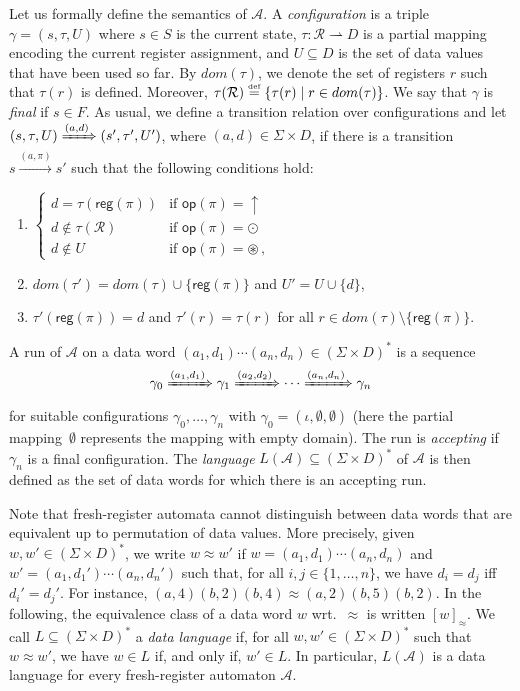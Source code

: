 \documentclass{LMCS}
\newcommand\df{\ensuremath{\mathrel{\smash{\stackrel{\scriptscriptstyle{
    \text{def}}}{=}}}}}
\newcommand{\pto}{\rightharpoonup}
\newcommand{\set}[1]{\{1,\ldots,#1\}}
\newcommand\domain[1]{dom(#1)}
\newcommand{\Data}{D}
\def\A{\mathcal A}
\newcommand{\Reg}{\mathcal{R}}
\newcommand{\regof}[1]{\textsf{reg}(#1)}
\newcommand{\opof}[1]{\textsf{op}(#1)}
\newcommand{\fStates}{F}
\newcommand{\States}{S}
\newcommand{\init}{\iota}
\newcommand{\xregtrans}[1]{\xrightarrow{#1}}
\newcommand{\conf}{\gamma}
\newcommand{\regm}{\tau}
\newcommand{\Used}{U}
\newcommand{\xconfrel}[1]{\xRightarrow{#1}}
\newcommand{\param}{\pi}
\begin{document}
Let us formally define the semantics of $\A$. A \emph{configuration} is a
triple $\conf = (s,\regm,\Used)$ where $s \in \States$ is the current
state, $\regm: \Reg \pto \Data$ is a partial mapping encoding the
current register assignment, and $\Used \subseteq \Data$ is the set of data values that have
been used so far. By $\domain \regm$, we denote the set of registers $r$ such that $\regm(r)$ is defined.
Moreover, $\regm(\Reg) \df \{\regm(r) \mid r \in \domain{\regm}\}$.
We say that $\conf$ is \emph{final} if $s \in
\fStates$. As usual, we define a transition relation over
configurations and let $(s,\regm,\Used) \xconfrel{(a,d)}
(s',\regm',\Used')$, where $(a,d) \in \Sigma \times \Data$, if there is
a transition $s \xregtrans{(a,\param)} s'$ such that the following
conditions hold:
\begin{enumerate}
\item $\begin{cases}
    d = \regm(\regof\param) & \text{if } \opof\param = {\uparrow}\\
    d \not\in \regm(\Reg) & \text{if } \opof\param = \odot\\
    d \not\in \Used & \text{if } \opof\param = \circledast\,,
  \end{cases}$
\item $\domain{\regm'} = \domain{\regm}\cup \{\regof\param\}$ and
  $\Used' = \Used \cup \{d\}$,
\item $\regm'(\regof\param) = d$ and $\regm'(r)=\regm(r)$ for all
  $r\in\domain{\regm}\setminus\{\regof\param\}$.
\end{enumerate}
A run of $\A$ on a data word $(a_1,d_1) \cdots (a_n,d_n) \in (\Sigma
\times \Data)^\ast$ is a sequence
\[\conf_0 \xconfrel{(a_1,d_1)} \conf_1 \xconfrel{(a_2,d_2)} \cdots
\xconfrel{(a_n,d_n)} \conf_n\] for suitable configurations
$\conf_0,\ldots,\conf_n$ with $\conf_0 = (\init,\emptyset,\emptyset)$
(here the partial mapping~$\emptyset$ represents the mapping with
empty domain).
The run is \emph{accepting} if $\conf_n$ is a final configuration. The
\emph{language} $L(\A) \subseteq (\Sigma \times \Data)^\ast$ of $\A$
is then defined as the set of data words for which there is an
accepting run.

Note that fresh-register automata cannot distinguish
between data words that are equivalent up to permutation of data
values. More precisely, given $w,w' \in (\Sigma \times \Data)^\ast$, we write $w\approx w'$
if $w=(a_1,d_1)\cdots (a_n,d_n)$ and $w'=(a_1,d_1')\cdots
(a_n,d_n')$ such that, for all $i,j \in \set{n}$, we have $d_i = d_j$ iff\ $d_i' = d_j'$.
For instance, $(a,4)(b,2)(b,4) \approx
(a,2)(b,5)(b,2)$.
In the following, the equivalence class of a data word
$w$ wrt.\ $\approx$ is written $[w]_{\approx}$.
We call $L \subseteq (\Sigma \times \Data)^\ast$ a \emph{data language} if,
for all $w,w' \in (\Sigma \times \Data)^\ast$ such that $w\approx w'$, we have $w \in L$ if, and only if, $w' \in L$. In particular, $L(\A)$ is a data language for every fresh-register automaton $\A$.
\end{document}
